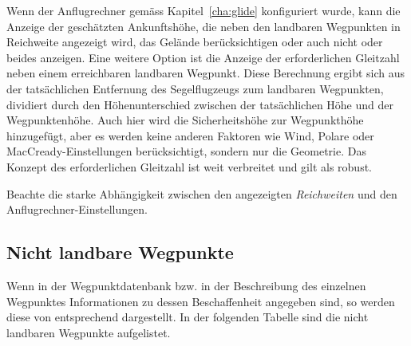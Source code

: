 Wenn der Anflugrechner gemäss Kapitel~\ref{cha:glide} konfiguriert wurde, kann die Anzeige der geschätzten Ankunftshöhe, die neben
den landbaren Wegpunkten in Reichweite angezeigt wird, das Gelände berücksichtigen oder auch nicht oder beides anzeigen.
Eine weitere Option ist die Anzeige der erforderlichen Gleitzahl neben einem erreichbaren landbaren Wegpunkt.
Diese Berechnung ergibt sich aus der tatsächlichen Entfernung des Segelflugzeugs zum landbaren Wegpunkten, dividiert
durch den Höhenunterschied zwischen der tatsächlichen Höhe und der Wegpunktenhöhe. Auch hier wird die Sicherheitshöhe zur Wegpunkthöhe
hinzugefügt, aber es werden keine anderen Faktoren wie Wind, Polare oder MacCready-Einstellungen berücksichtigt,
sondern nur die Geometrie. Das Konzept des erforderlichen Gleitzahl ist weit verbreitet und gilt als robust.


\tip Beachte die starke Abhängigkeit zwischen den angezeigten \emph{Reichweiten} und den Anflugrechner-Einstellungen.


\subsection*{Nicht landbare Wegpunkte}
Wenn in der Wegpunktdatenbank bzw. in der Beschreibung des einzelnen Wegpunktes Informationen zu dessen Beschaffenheit angegeben sind, so werden diese von \xc   entsprechend dargestellt. In der folgenden Tabelle sind die nicht landbaren Wegpunkte aufgelistet. 

